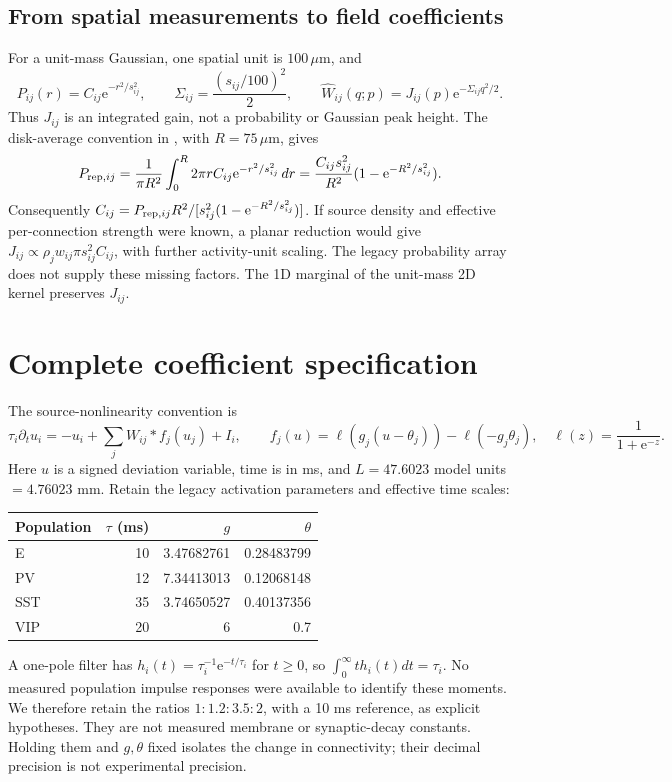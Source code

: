 \documentclass[11pt]{article}
\newcommand{\ee}{\mathrm e}
\begin{document}
\subsection{From spatial measurements to field coefficients}
For a unit-mass Gaussian, one spatial unit is $100\,\mu$m, and
\begin{equation}
 P_{ij}(r)=C_{ij}\ee^{-r^2/s_{ij}^2},\qquad
 \Sigma_{ij}=\frac{(s_{ij}/100)^2}{2},\qquad
 \widehat W_{ij}(q;p)=J_{ij}(p)\ee^{-\Sigma_{ij}q^2/2}.
 \label{eq:width}
\end{equation}
Thus $J_{ij}$ is an integrated gain, not a probability or Gaussian peak height.
The disk-average convention in \cite{billeh}, with $R=75\,\mu$m, gives
\begin{equation}
 P_{{\rm rep},ij}=\frac{1}{\pi R^2}\int_0^R2\pi r C_{ij}\ee^{-r^2/s_{ij}^2}\,dr
 =\frac{C_{ij}s_{ij}^2}{R^2}(1-\ee^{-R^2/s_{ij}^2}).
\end{equation}
Consequently $C_{ij}=P_{{\rm rep},ij}R^2/[s_{ij}^2(1-\ee^{-R^2/s_{ij}^2})]$.
If source density and effective per-connection strength were known, a planar
reduction would give $J_{ij}\propto\rho_j w_{ij}\pi s_{ij}^2C_{ij}$, with further
activity-unit scaling. The legacy probability array does not supply these
missing factors. The 1D marginal of the unit-mass 2D kernel preserves $J_{ij}$.

\newpage
\section{Complete coefficient specification}
The source-nonlinearity convention is
\begin{equation}
 \tau_i\partial_tu_i=-u_i+\sum_jW_{ij}*f_j(u_j)+I_i,\qquad
 f_j(u)=\ell(g_j(u-\theta_j))-\ell(-g_j\theta_j),\quad
 \ell(z)=\frac{1}{1+\ee^{-z}}.
 \label{eq:model}
\end{equation}
Here $u$ is a signed deviation variable, time is in ms, and
$L=47.6023$ model units $=4.76023$ mm. Retain the legacy activation parameters
and effective time scales:
\begin{center}
\begin{tabular}{lrrr}\toprule
Population&$\tau$ (ms)&$g$&$\theta$\\\midrule
E&10&3.47682761&0.28483799\\
PV&12&7.34413013&0.12068148\\
SST&35&3.74650527&0.40137356\\
VIP&20&6&0.7\\\bottomrule
\end{tabular}
\end{center}
A one-pole filter has $h_i(t)=\tau_i^{-1}\ee^{-t/\tau_i}$ for $t\geq0$, so
$\int_0^\infty t h_i(t)dt=\tau_i$. No measured population impulse responses
were available to identify these moments. We therefore retain the ratios
$1:1.2:3.5:2$, with a 10 ms reference, as explicit hypotheses. They are not
measured membrane or synaptic-decay constants. Holding them and $g,\theta$ fixed
isolates the change in connectivity; their decimal precision is not experimental
precision.
\end{document}
